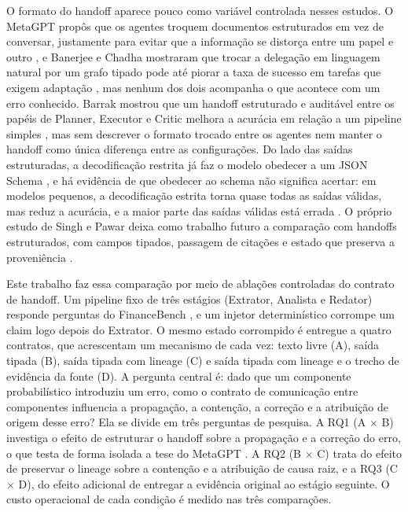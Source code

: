 O formato do handoff aparece pouco como variável controlada nesses estudos.
O MetaGPT propôs que os agentes troquem documentos estruturados em vez de conversar, justamente para evitar que a informação se distorça entre um papel e outro \cite{hong2023metagpt}, e Banerjee e Chadha mostraram que trocar a delegação em linguagem natural por um grafo tipado pode até piorar a taxa de sucesso em tarefas que exigem adaptação \cite{banerjee2026routed}, mas nenhum dos dois acompanha o que acontece com um erro conhecido.
Barrak mostrou que um handoff estruturado e auditável entre os papéis de Planner, Executor e Critic melhora a acurácia em relação a um pipeline simples \cite{barrak2025traceability}, mas sem descrever o formato trocado entre os agentes nem manter o handoff como única diferença entre as configurações.
Do lado das saídas estruturadas, a decodificação restrita já faz o modelo obedecer a um JSON Schema \cite{geng2025structured}, e há evidência de que obedecer ao schema não significa acertar: em modelos pequenos, a decodificação estrita torna quase todas as saídas válidas, mas reduz a acurácia, e a maior parte das saídas válidas está errada \cite{ray2026constraint}.
O próprio estudo de Singh e Pawar deixa como trabalho futuro a comparação com handoffs estruturados, com campos tipados, passagem de citações e estado que preserva a proveniência \cite{singh2026snowball}.

Este trabalho faz essa comparação por meio de ablações controladas do contrato de handoff. Um pipeline fixo de três estágios (Extrator, Analista e Redator) responde perguntas do FinanceBench \cite{islam2023financebench}, e um injetor determinístico corrompe um claim logo depois do Extrator.
O mesmo estado corrompido é entregue a quatro contratos, que acrescentam um mecanismo de cada vez: texto livre (A), saída tipada (B), saída tipada com lineage (C) e saída tipada com lineage e o trecho de evidência da fonte (D). A pergunta central é: dado que um componente probabilístico introduziu um erro, como o contrato de comunicação entre componentes influencia a propagação, a contenção, a correção e a atribuição de origem desse erro? Ela se divide em três perguntas de pesquisa. A RQ1 (A $\times$ B) investiga o efeito de estruturar o handoff sobre a propagação e a correção do erro, o que testa de forma isolada a tese do MetaGPT \cite{hong2023metagpt}. A RQ2 (B $\times$ C) trata do efeito de preservar o lineage sobre a contenção e a atribuição de causa raiz, e a RQ3 (C $\times$ D), do efeito adicional de entregar a evidência original ao estágio seguinte. O custo operacional de cada condição é medido nas três comparações.

